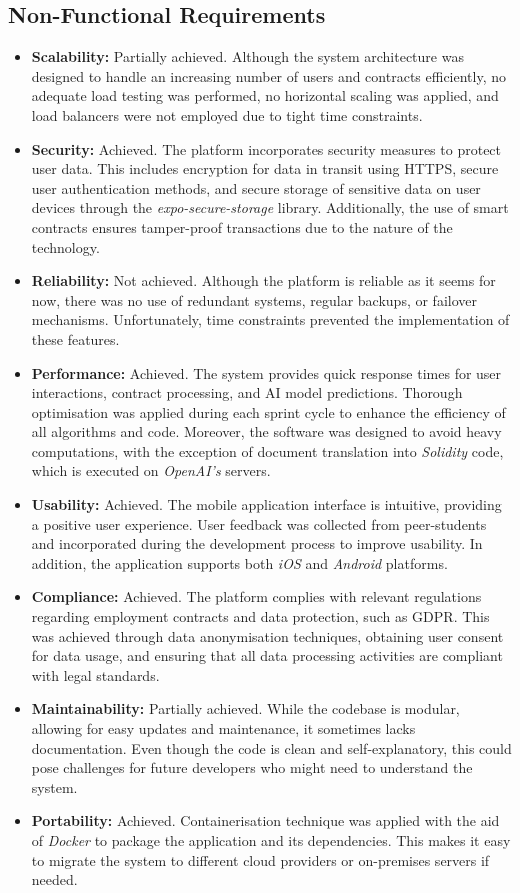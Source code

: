 \subsection{Non-Functional Requirements}

\begin{itemize}
    \item \textbf{Scalability:} Partially achieved. Although the system architecture was designed to handle an increasing number of users and contracts efficiently, no adequate load testing was performed, no horizontal scaling was applied, and load balancers were not employed due to tight time constraints.
    \item \textbf{Security:} Achieved. The platform incorporates security measures to protect user data. This includes encryption for data in transit using HTTPS, secure user authentication methods, and secure storage of sensitive data on user devices through the \textit{expo-secure-storage} library. Additionally, the use of smart contracts ensures tamper-proof transactions due to the nature of the technology.
    \item \textbf{Reliability:} Not achieved. Although the platform is reliable as it seems for now, there was no use of redundant systems, regular backups, or failover mechanisms. Unfortunately, time constraints prevented the implementation of these features.
    \item \textbf{Performance:} Achieved. The system provides quick response times for user interactions, contract processing, and AI model predictions. Thorough optimisation was applied during each sprint cycle to enhance the efficiency of all algorithms and code. Moreover, the software was designed to avoid heavy computations, with the exception of document translation into \textit{Solidity} code, which is executed on \textit{OpenAI's} servers.
    \item \textbf{Usability:} Achieved. The mobile application interface is intuitive, providing a positive user experience. User feedback was collected from peer-students and incorporated during the development process to improve usability. In addition, the application supports both \textit{iOS} and \textit{Android} platforms.
    \item \textbf{Compliance:} Achieved. The platform complies with relevant regulations regarding employment contracts and data protection, such as GDPR. This was achieved through data anonymisation techniques, obtaining user consent for data usage, and ensuring that all data processing activities are compliant with legal standards.
    \item \textbf{Maintainability:} Partially achieved. While the codebase is modular, allowing for easy updates and maintenance, it sometimes lacks documentation. Even though the code is clean and self-explanatory, this could pose challenges for future developers who might need to understand the system.
    \item \textbf{Portability:} Achieved. Containerisation technique was applied with the aid of \textit{Docker} to package the application and its dependencies. This makes it easy to migrate the system to different cloud providers or on-premises servers if needed.
\end{itemize}


